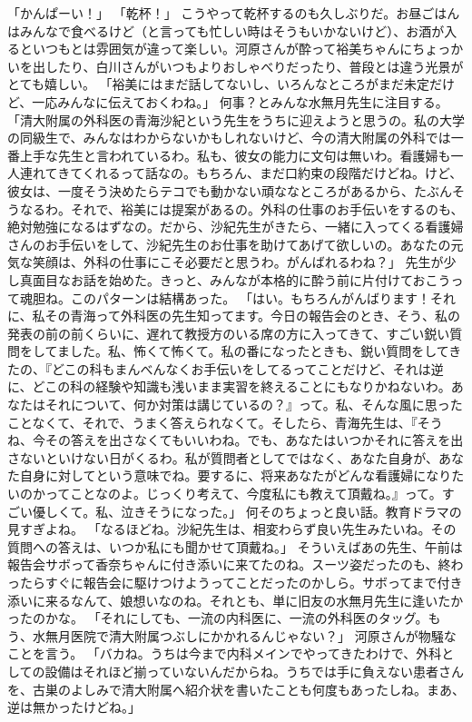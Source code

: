 「かんぱーい！」
「乾杯！」
こうやって乾杯するのも久しぶりだ。お昼ごはんはみんなで食べるけど（と言っても忙しい時はそうもいかないけど）、お酒が入るといつもとは雰囲気が違って楽しい。河原さんが酔って裕美ちゃんにちょっかいを出したり、白川さんがいつもよりおしゃべりだったり、普段とは違う光景がとても嬉しい。
「裕美にはまだ話してないし、いろんなところがまだ未定だけど、一応みんなに伝えておくわね。」
何事？とみんな水無月先生に注目する。
「清大附属の外科医の青海沙紀という先生をうちに迎えようと思うの。私の大学の同級生で、みんなはわからないかもしれないけど、今の清大附属の外科では一番上手な先生と言われているわ。私も、彼女の能力に文句は無いわ。看護婦も一人連れてきてくれるって話なの。もちろん、まだ口約束の段階だけどね。けど、彼女は、一度そう決めたらテコでも動かない頑ななところがあるから、たぶんそうなるわ。それで、裕美には提案があるの。外科の仕事のお手伝いをするのも、絶対勉強になるはずなの。だから、沙紀先生がきたら、一緒に入ってくる看護婦さんのお手伝いをして、沙紀先生のお仕事を助けてあげて欲しいの。あなたの元気な笑顔は、外科の仕事にこそ必要だと思うわ。がんばれるわね？」
先生が少し真面目なお話を始めた。きっと、みんなが本格的に酔う前に片付けておこうって魂胆ね。このパターンは結構あった。
「はい。もちろんがんばります！それに、私その青海って外科医の先生知ってます。今日の報告会のとき、そう、私の発表の前の前くらいに、遅れて教授方のいる席の方に入ってきて、すごい鋭い質問をしてました。私、怖くて怖くて。私の番になったときも、鋭い質問をしてきたの、『どこの科もまんべんなくお手伝いをしてるってことだけど、それは逆に、どこの科の経験や知識も浅いまま実習を終えることにもなりかねないわ。あなたはそれについて、何か対策は講じているの？』って。私、そんな風に思ったことなくて、それで、うまく答えられなくて。そしたら、青海先生は、『そうね、今その答えを出さなくてもいいわね。でも、あなたはいつかそれに答えを出さないといけない日がくるわ。私が質問者としてではなく、あなた自身が、あなた自身に対してという意味でね。要するに、将来あなたがどんな看護婦になりたいのかってことなのよ。じっくり考えて、今度私にも教えて頂戴ね。』って。すごい優しくて。私、泣きそうになった。」
何そのちょっと良い話。教育ドラマの見すぎよね。
「なるほどね。沙紀先生は、相変わらず良い先生みたいね。その質問への答えは、いつか私にも聞かせて頂戴ね。」
そういえばあの先生、午前は報告会サボって香奈ちゃんに付き添いに来てたのね。スーツ姿だったのも、終わったらすぐに報告会に駆けつけようってことだったのかしら。サボってまで付き添いに来るなんて、娘想いなのね。それとも、単に旧友の水無月先生に逢いたかったのかな。
「それにしても、一流の内科医に、一流の外科医のタッグ。もう、水無月医院で清大附属つぶしにかかれるんじゃない？」
河原さんが物騒なことを言う。
「バカね。うちは今まで内科メインでやってきたわけで、外科としての設備はそれほど揃っていないんだからね。うちでは手に負えない患者さんを、古巣のよしみで清大附属へ紹介状を書いたことも何度もあったしね。まあ、逆は無かったけどね。」
